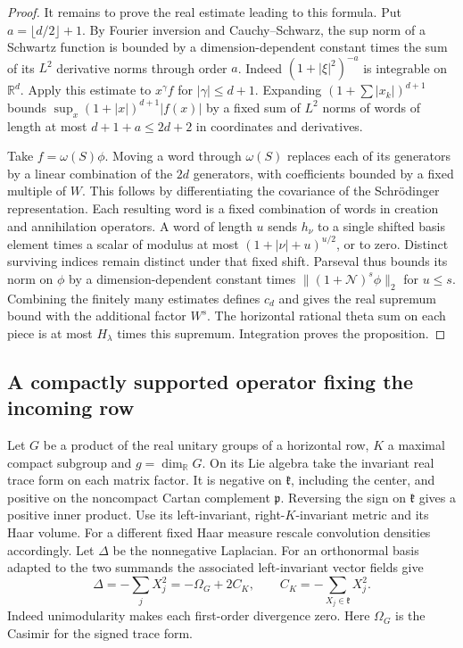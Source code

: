 \documentclass[a4paper,11pt]{article}
\theoremstyle{definition}
\theoremstyle{remark}
\numberwithin{equation}{section}
\begin{document}
\begin{proof}
It remains to prove the real estimate leading to this formula.
Put \(a=\lfloor d/2\rfloor+1\). By Fourier inversion and
Cauchy--Schwarz, the sup norm of a Schwartz function is
bounded by a dimension-dependent constant times the sum of
its \(L^2\) derivative norms through order \(a\). Indeed
\((1+|\xi|^2)^{-a}\) is integrable on \(\mathbb R^d\).
Apply this estimate to \(x^\gamma f\) for
\(|\gamma|\le d+1\). Expanding
\((1+\sum |x_k|)^{d+1}\) bounds
\(\sup_x(1+|x|)^{d+1}|f(x)|\) by a fixed sum of \(L^2\)
norms of words of length at most \(d+1+a\le2d+2\) in
coordinates and derivatives.

Take \(f=\omega(S)\phi\). Moving a word through \(\omega(S)\)
replaces each of its generators by a linear combination
of the \(2d\) generators, with coefficients bounded by a
fixed multiple of \(W\). This follows by differentiating the
covariance of the Schr\"odinger representation. Each resulting
word is a fixed combination of words in creation and annihilation
operators. A word of length \(u\) sends \(h_\nu\) to a single
shifted basis element times a scalar of modulus at most
\((1+|\nu|+u)^{u/2}\), or to zero. Distinct surviving indices
remain distinct under that fixed shift. Parseval thus bounds
its norm on \(\phi\) by a dimension-dependent constant times
\(\|(1+\mathcal N)^s\phi\|_2\) for \(u\le s\).
Combining the finitely many estimates defines \(c_d\) and
gives the real supremum bound with the additional factor
\(W^s\). The horizontal rational theta sum on each piece
is at most \(H_\lambda\) times this supremum. Integration
proves the proposition.
\end{proof}

\subsection{A compactly supported operator fixing the incoming row}\label{nav:VI-43}
Let \(G\) be a product of the real unitary groups of a horizontal
row, \(K\) a maximal compact subgroup and \(g=\dim_{\mathbb R}G\).
On its Lie algebra take the invariant real trace form on each
matrix factor. It is negative on \(\mathfrak k\), including
the center, and positive on the noncompact Cartan complement
\(\mathfrak p\). Reversing the sign on \(\mathfrak k\) gives a
positive inner product. Use its left-invariant, right-\(K\)-invariant
metric and its Haar volume. For a different fixed Haar measure
rescale convolution densities accordingly. Let \(\Delta\)
be the nonnegative Laplacian. For an orthonormal basis adapted
to the two summands the associated left-invariant vector fields
give
\[
       \Delta=-\sum_j X_j^2=-\Omega_G+2C_K,\qquad
       C_K=-\sum_{X_j\in\mathfrak k}X_j^2.
\]
Indeed unimodularity makes each first-order divergence zero.
Here \(\Omega_G\) is the Casimir for the signed trace form.
\end{document}
